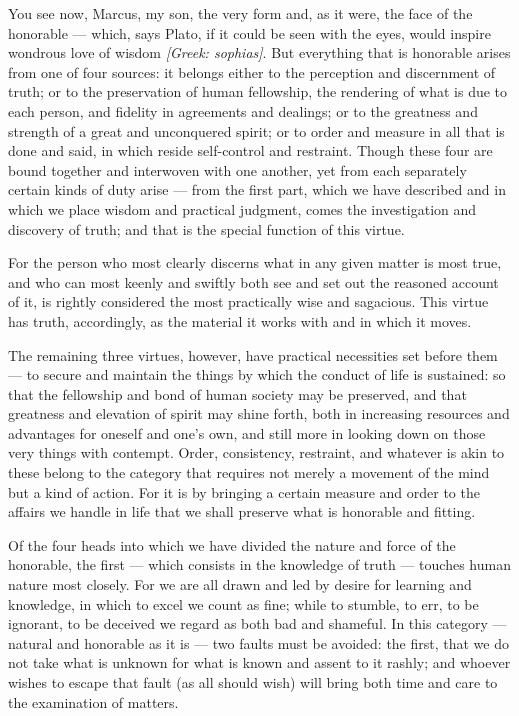  You see now, Marcus, my son, the very form and, as it were, the face of the honorable — which, says Plato, if it could be seen with the eyes, would inspire wondrous love of wisdom \textit{[Greek: sophias]}. But everything that is honorable arises from one of four sources: it belongs either to the perception and discernment of truth; or to the preservation of human fellowship, the rendering of what is due to each person, and fidelity in agreements and dealings; or to the greatness and strength of a great and unconquered spirit; or to order and measure in all that is done and said, in which reside self-control and restraint. Though these four are bound together and interwoven with one another, yet from each separately certain kinds of duty arise — from the first part, which we have described and in which we place wisdom and practical judgment, comes the investigation and discovery of truth; and that is the special function of this virtue.

 For the person who most clearly discerns what in any given matter is most true, and who can most keenly and swiftly both see and set out the reasoned account of it, is rightly considered the most practically wise and sagacious. This virtue has truth, accordingly, as the material it works with and in which it moves.

 The remaining three virtues, however, have practical necessities set before them — to secure and maintain the things by which the conduct of life is sustained: so that the fellowship and bond of human society may be preserved, and that greatness and elevation of spirit may shine forth, both in increasing resources and advantages for oneself and one's own, and still more in looking down on those very things with contempt. Order, consistency, restraint, and whatever is akin to these belong to the category that requires not merely a movement of the mind but a kind of action. For it is by bringing a certain measure and order to the affairs we handle in life that we shall preserve what is honorable and fitting.

 Of the four heads into which we have divided the nature and force of the honorable, the first — which consists in the knowledge of truth — touches human nature most closely. For we are all drawn and led by desire for learning and knowledge, in which to excel we count as fine; while to stumble, to err, to be ignorant, to be deceived we regard as both bad and shameful. In this category — natural and honorable as it is — two faults must be avoided: the first, that we do not take what is unknown for what is known and assent to it rashly; and whoever wishes to escape that fault (as all should wish) will bring both time and care to the examination of matters.

